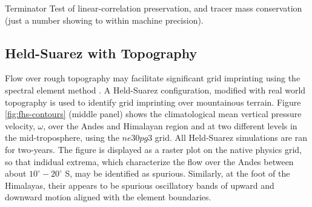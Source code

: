 \documentclass{agujournal}
\begin{document}
{\color{red}Terminator Test of linear-correlation preservation, and tracer mass conservation (just a number showing to within machine precision).}

\subsection{Held-Suarez with Topography}

Flow over rough topography may facilitate significant grid imprinting using the spectral element method \citep{gmdd-8-4623-2015,HL2018MWR}. A Held-Suarez configuration, modified with real world topography is used to identify grid imprinting over mountainous terrain. Figure \ref{fig:fhs-contours} (middle panel) shows the climatological mean vertical pressure velocity, $\omega$, over the Andes and Himalayan region and at two different levels in the mid-troposphere, using the $ne30pg3$ grid. All Held-Suarez simulations are ran for two-years. The figure is displayed as a raster plot on the native physics grid, so that indidual extrema, which characterize the flow over the Andes between about $10^\circ-20^\circ$ S, may be identified as spurious. Similarly, at the foot of the Himalayas, their appears to be spurious oscillatory bands of upward and downward motion aligned with the element boundaries. 
\end{document}
